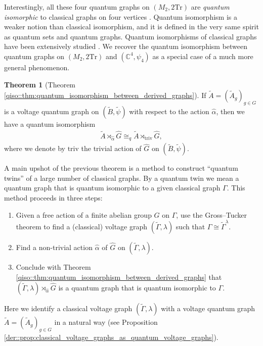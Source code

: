 \documentclass{amsart}
\newcommand{\C}{\mathbb{C}}
\theoremstyle{definition}
\newtheorem{introthm}{Theorem}
\theoremstyle{definition}
\begin{document}
Interestingly, all these four quantum graphs on $(M_2, 2 \mathrm{Tr})$ are \emph{quantum isomorphic} to classical graphs on four vertices \cite{matsuda_classification_2022}. Quantum isomorphism is a weaker notion than classical isomorphism, and it is defined in the very same spirit as quantum sets and quantum graphs. Quantum isomorphisms of classical graphs have been extensively studied \cite{atserias_quantum_2019, mancinska_quantum_2019}.
We recover the quantum isomorphism between quantum graphs on $(M_2, 2 \mathrm{Tr})$ and $(\C^4, \psi_4)$ as a special case of a much more general phenomenon.

\begin{introthm}[Theorem \ref{qiso::thm:quantum_isomorphism_between_derived_graphs}]
    If $\tilde{A} = (\tilde{A}_g)_{g \in G}$ is a voltage quantum graph on $(\tilde{B}, \tilde{\psi})$ with respect to the action $\hat{\alpha}$, then we have a quantum isomorphism
    \begin{align*}
        \tilde{A} \rtimes_{\hat{\alpha}} \hat{G} \cong_q \tilde{A} \rtimes_{\mathrm{triv}} \hat{G},
    \end{align*}
    where we denote by $\mathrm{triv}$ the trivial action of $\hat{G}$ on $(\tilde{B}, \tilde{\psi})$.
\end{introthm}

A main upshot of the previous theorem is a method to construct ``quantum twins'' of a large number of classical graphs. By a quantum twin we mean a quantum graph that is quantum isomorphic to a given classical graph $\Gamma$. This method proceeds in three steps:
\begin{enumerate}
    \item Given a free action of a finite abelian group $G$ on $\Gamma$, use the Gross--Tucker theorem to find a (classical) voltage graph $(\tilde{\Gamma}, \lambda)$ such that $\Gamma \cong \tilde{\Gamma}^\lambda$.
    \item Find a non-trivial action $\hat{\alpha}$ of $\hat{G}$ on $(\tilde{\Gamma}, \lambda)$.
    \item Conclude with Theorem \ref{qiso::thm:quantum_isomorphism_between_derived_graphs} that $(\tilde{\Gamma}, \lambda) \rtimes_{\hat{\alpha}} \hat{G}$ is a quantum graph that is quantum isomorphic to $\Gamma$.
\end{enumerate}
Here we identify a classical voltage graph $(\tilde{\Gamma}, \lambda)$ with a voltage quantum graph $\tilde{A} = (\tilde{A}_g)_{g \in G}$ in a natural way (see Proposition \ref{der::prop:classical_voltage_graphs_as_quantum_voltage_graphs}).
\end{document}

